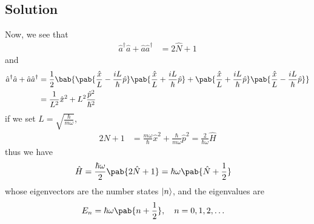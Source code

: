 \subsection{Solution}
Now, we see that
\begin{align}
  \hat{a}^\dagger \hat{a} + \hat{a} \hat{a}^{\dagger} & = 2 \hat{N} + 1
\end{align}
and
\begin{align}
  \hat{a}^\dagger \hat{a} + \hat{a} \hat{a}^{\dagger}
   & = \frac{1}{2} \bab{
    \pab{\frac{\hat{x}}{L} - \frac{iL}{\hbar} \hat{p}} \pab{\frac{\hat{x}}{L} + \frac{iL}{\hbar} \hat{p}} +
    \pab{\frac{\hat{x}}{L} + \frac{iL}{\hbar} \hat{p}} \pab{\frac{\hat{x}}{L} - \frac{iL}{\hbar} \hat{p}}
  }                                                            \\
   & = \frac{1}{L^2} \hat{x}^2 + L^2 \frac{\hat{p}^2}{\hbar^2}
\end{align}
if we set $L = \sqrt{\frac{\hbar}{m \omega}}$,
\begin{align}
  2 \hat{N} + 1 & = \frac{m \omega}{\hbar} \hat{x}^2 + \frac{\hbar}{m \omega} \hat{p}^2 = \frac{2}{\hbar \omega} \hat{H}
\end{align}
thus we have
\begin{align}
  \hat{H} & = \frac{\hbar \omega}{2} \pab{2 \hat{N} + 1} = \hbar \omega \pab{\hat{N} + \frac{1}{2}}
\end{align}
whose eigenvectors are the number states $\lvert n\rangle$, and the eigenvalues are
\begin{align}
  E_n & = \hbar \omega \pab{n + \frac{1}{2}}, \quad n = 0, 1, 2, \ldots
\end{align}

